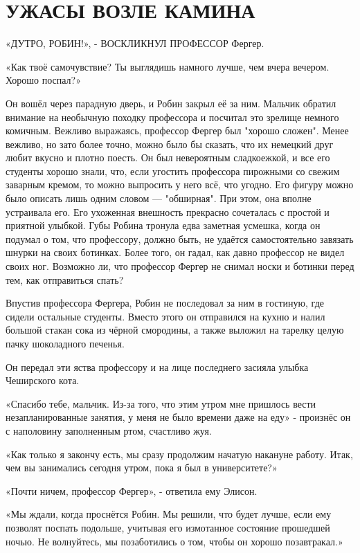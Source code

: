 \documentclass[a4paper,12pt]{book}
\begin{document}
\chapter{УЖАСЫ ВОЗЛЕ КАМИНА}
\noindent\par«Д{ УТРО, РОБИН!», - ВОСКЛИКНУЛ ПРОФЕССОР} Фергер.
\par
«Как твоё самочувствие? Ты выглядишь намного лучше, чем вчера вечером. Хорошо поспал?»
\par
Он вошёл через парадную дверь, и Робин закрыл её за ним. Мальчик обратил внимание на необычную походку профессора и посчитал это зрелище немного комичным. Вежливо выражаясь, профессор Фергер был "хорошо сложен". Менее вежливо, но зато более точно, можно было бы сказать, что их немецкий друг любит вкусно и плотно поесть. Он был невероятным сладкоежкой, и все его студенты хорошо знали, что, если угостить профессора пирожными со свежим заварным кремом, то можно выпросить у него всё, что угодно. Его фигуру можно было описать лишь одним словом — "обширная". При этом, она вполне устраивала его. Его ухоженная внешность прекрасно сочеталась с простой и приятной улыбкой. Губы Робина тронула едва заметная усмешка, когда он подумал о том, что профессору, должно быть, не удаётся самостоятельно завязать шнурки на своих ботинках. Более того, он гадал, как давно профессор не видел своих ног. Возможно ли, что профессор Фергер не снимал носки и ботинки перед тем, как отправиться спать?\\
\par
Впустив профессора Фергера, Робин не последовал за ним в гостиную, где сидели остальные студенты. Вместо этого он отправился на кухню и налил большой стакан сока из чёрной смородины, а также выложил на тарелку целую пачку шоколадного печенья.
\par
Он передал эти яства профессору и на лице последнего засияла улыбка Чеширского кота.
\par
«Спасибо тебе, мальчик. Из-за того, что этим утром мне пришлось вести незапланированные занятия, у меня не было времени даже на еду» - произнёс он с наполовину заполненным ртом, счастливо жуя.
\par
«Как только я закончу есть, мы сразу продолжим начатую накануне работу. Итак, чем вы занимались сегодня утром, пока я был в университете?»
\par
«Почти ничем, профессор Фергер», - ответила ему Элисон.
\par
«Мы ждали, когда проснётся Робин. Мы решили, что будет лучше, если ему позволят поспать подольше, учитывая его измотанное состояние прошедшей ночью. Не волнуйтесь, мы позаботились о том, чтобы он хорошо позавтракал.»
\end{document}
